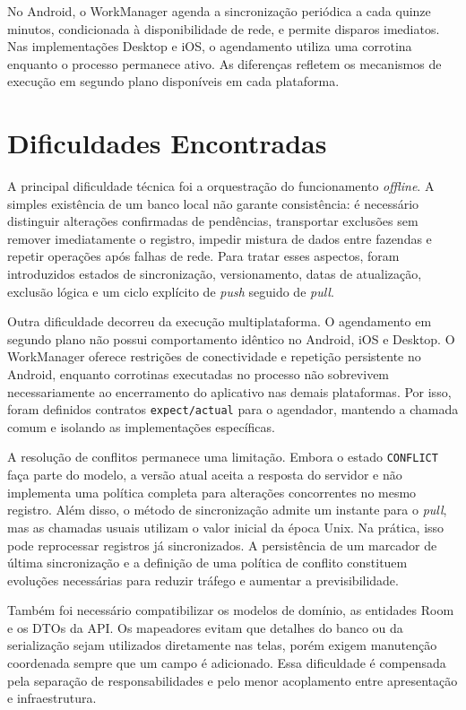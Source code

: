 No Android, o WorkManager agenda a sincronização periódica a cada quinze minutos, condicionada à disponibilidade de rede, e permite disparos imediatos. Nas implementações Desktop e iOS, o agendamento utiliza uma corrotina enquanto o processo permanece ativo. As diferenças refletem os mecanismos de execução em segundo plano disponíveis em cada plataforma.

\section{Dificuldades Encontradas}
\label{sec:desenvolvimento-dificuldades}

A principal dificuldade técnica foi a orquestração do funcionamento \textit{offline}. A simples existência de um banco local não garante consistência: é necessário distinguir alterações confirmadas de pendências, transportar exclusões sem remover imediatamente o registro, impedir mistura de dados entre fazendas e repetir operações após falhas de rede. Para tratar esses aspectos, foram introduzidos estados de sincronização, versionamento, datas de atualização, exclusão lógica e um ciclo explícito de \textit{push} seguido de \textit{pull}.

Outra dificuldade decorreu da execução multiplataforma. O agendamento em segundo plano não possui comportamento idêntico no Android, iOS e Desktop. O WorkManager oferece restrições de conectividade e repetição persistente no Android, enquanto corrotinas executadas no processo não sobrevivem necessariamente ao encerramento do aplicativo nas demais plataformas. Por isso, foram definidos contratos \texttt{expect/actual} para o agendador, mantendo a chamada comum e isolando as implementações específicas.

A resolução de conflitos permanece uma limitação. Embora o estado \texttt{CONFLICT} faça parte do modelo, a versão atual aceita a resposta do servidor e não implementa uma política completa para alterações concorrentes no mesmo registro. Além disso, o método de sincronização admite um instante para o \textit{pull}, mas as chamadas usuais utilizam o valor inicial da época Unix. Na prática, isso pode reprocessar registros já sincronizados. A persistência de um marcador de última sincronização e a definição de uma política de conflito constituem evoluções necessárias para reduzir tráfego e aumentar a previsibilidade.

Também foi necessário compatibilizar os modelos de domínio, as entidades Room e os DTOs da API. Os mapeadores evitam que detalhes do banco ou da serialização sejam utilizados diretamente nas telas, porém exigem manutenção coordenada sempre que um campo é adicionado. Essa dificuldade é compensada pela separação de responsabilidades e pelo menor acoplamento entre apresentação e infraestrutura.

